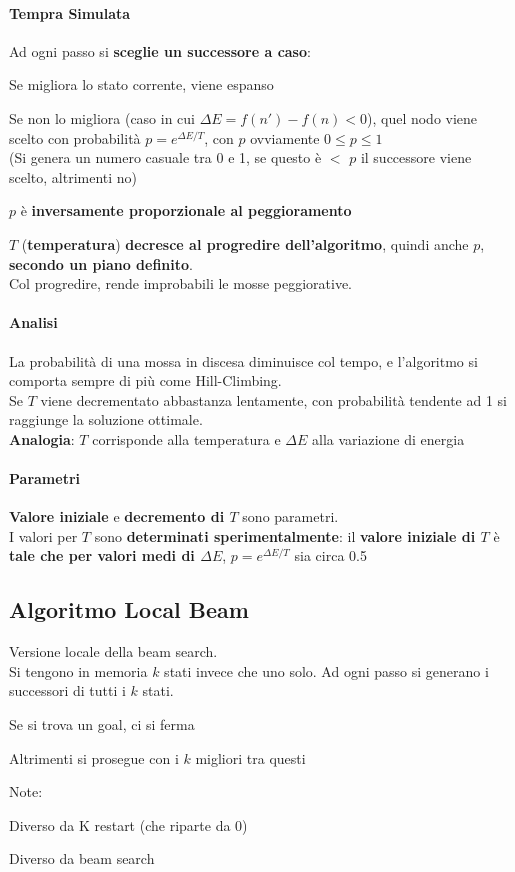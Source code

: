 \documentclass[10pt]{book}
\begin{document}
\paragraph{Tempra Simulata} Ad ogni passo si \textbf{sceglie un successore a caso}:
\begin{list}{}{}
	\item Se migliora lo stato corrente, viene espanso
	\item Se non lo migliora (caso in cui $\Delta E = f(n') - f(n) < 0$), quel nodo viene scelto con probabilità $p = e^{\Delta E/T}$, con $p$ ovviamente $0 \leq p \leq 1$\\
	(Si genera un numero casuale tra 0 e 1, se questo è $<$ $p$ il successore viene scelto, altrimenti no)
	\item $p$ è \textbf{inversamente proporzionale al peggioramento}
	\item $T$ (\textbf{temperatura}) \textbf{decresce al progredire dell'algoritmo}, quindi anche $p$, \textbf{secondo un piano definito}.\\
	Col progredire, rende improbabili le mosse peggiorative.
\end{list}
\paragraph{Analisi} La probabilità di una mossa in discesa diminuisce col tempo, e l'algoritmo si comporta sempre di più come Hill-Climbing.\\
Se $T$ viene decrementato abbastanza lentamente, con probabilità tendente ad 1 si raggiunge la soluzione ottimale.\\
\textbf{Analogia}: $T$ corrisponde alla temperatura e $\Delta E$ alla variazione di energia
\paragraph{Parametri} \textbf{Valore iniziale} e \textbf{decremento di $T$} sono parametri.\\
I valori per $T$ sono \textbf{determinati sperimentalmente}: il \textbf{valore iniziale di $T$} è \textbf{tale che per valori medi di $\Delta E$}, $p = e^{\Delta E/T}$ sia circa 0.5
\subsection{Algoritmo Local Beam}
Versione locale della beam search.\\
Si tengono in memoria $k$ stati invece che uno solo. Ad ogni passo si generano i successori di tutti i $k$ stati.
\begin{list}{}{}
	\item Se si trova un goal, ci si ferma
	\item Altrimenti si prosegue con i $k$ migliori tra questi
\end{list}
Note:
\begin{list}{}{}
	\item Diverso da K restart (che riparte da 0)
	\item Diverso da beam search
\end{list}
\pagebreak
\end{document}
